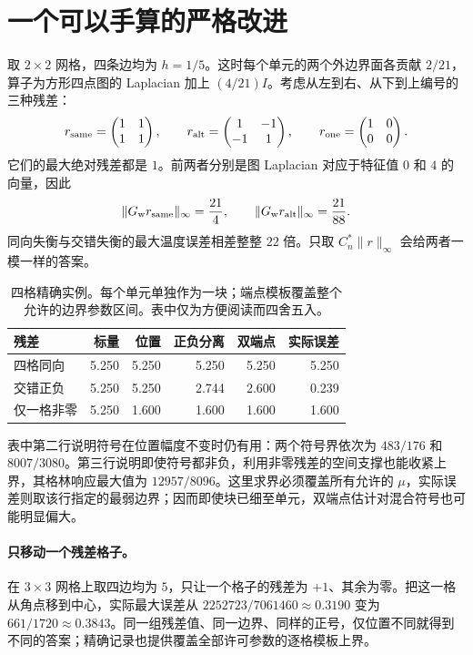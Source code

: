 \section{一个可以手算的严格改进}
取 $2\times2$ 网格，四条边均为 $h=1/5$。这时每个单元的两个外边界面各贡献 $2/21$，算子为方形四点图的 Laplacian 加上 $(4/21)I$。考虑从左到右、从下到上编号的三种残差：
\[
 r_{\rm same}=\begin{pmatrix}1&1\\1&1\end{pmatrix},\qquad
 r_{\rm alt}=\begin{pmatrix}1&-1\\-1&1\end{pmatrix},\qquad
 r_{\rm one}=\begin{pmatrix}1&0\\0&0\end{pmatrix}.
\]
它们的最大绝对残差都是 $1$。前两者分别是图 Laplacian 对应于特征值 $0$ 和 $4$ 的向量，因此
\[
 \|G_{\rm w}r_{\rm same}\|_\infty=\frac{21}{4},\qquad
 \|G_{\rm w}r_{\rm alt}\|_\infty=\frac{21}{88}.
\]
同向失衡与交错失衡的最大温度误差相差整整 $22$ 倍。只取 $C_n^*\|r\|_\infty$ 会给两者一模一样的答案。

\begin{table}[ht]\centering\small
\caption{四格精确实例。每个单元单独作为一块；端点模板覆盖整个允许的边界参数区间。表中仅为方便阅读而四舍五入。}
\begin{tabular}{lrrrrr}\toprule
残差 & 标量 & 位置 & 正负分离 & 双端点 & 实际误差\\\midrule
四格同向 & 5.250 & 5.250 & 5.250 & 5.250 & 5.250\\
交错正负 & 5.250 & 5.250 & 2.744 & 2.600 & 0.239\\
仅一格非零 & 5.250 & 1.600 & 1.600 & 1.600 & 1.600\\\bottomrule
\end{tabular}
\end{table}

表中第二行说明符号在位置幅度不变时仍有用：两个符号界依次为
$483/176$ 和 $8007/3080$。第三行说明即使符号都非负，利用非零残差的空间支撑也能收紧上界，其格林响应最大值为 $12957/8096$。这里求界必须覆盖所有允许的 $\mu$，实际误差则取该行指定的最弱边界；因而即使块已细至单元，双端点估计对混合符号也可能明显偏大。

\paragraph{只移动一个残差格子。}
在 $3\times3$ 网格上取四边均为 $5$，只让一个格子的残差为 $+1$、其余为零。把这一格从角点移到中心，实际最大误差从 $2252723/7061460\approx0.3190$ 变为 $661/1720\approx0.3843$。同一组残差值、同一边界、同样的正号，仅位置不同就得到不同的答案；精确记录也提供覆盖全部许可参数的逐格模板上界。

